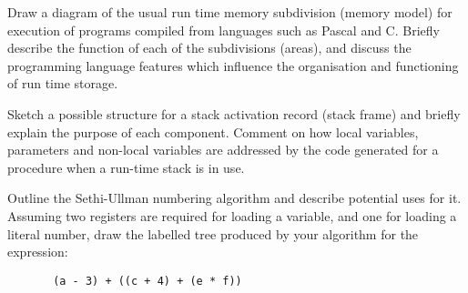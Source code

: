 \question

\begin{subquestions}
\subquestion
Draw a diagram of the usual run time memory
subdivision (memory model) for execution of
programs compiled from languages such as
Pascal and C.  Briefly describe the function of each
of the subdivisions (areas), and discuss
the programming language features which influence
the organisation and functioning of run time storage.

\subquestion
Sketch a possible structure for a stack activation
record (stack frame) and briefly explain the purpose of
each component. Comment on how local variables,
parameters and non-local variables
are addressed by the code generated for a
procedure when a run-time stack is in use. 

\subquestion
Outline the Sethi-Ullman numbering algorithm and 
describe potential uses for it.  Assuming two registers
are required for loading a variable, and one for loading a literal number, 
draw the labelled
tree produced by your algorithm for the expression:
\begin{verbatim}
       (a - 3) + ((c + 4) + (e * f))
\end{verbatim}

\end{subquestions}
 

